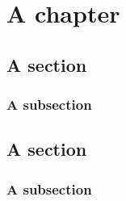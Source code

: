 \chapter{A chapter}

\lipsum


\section{A section}

\lipsum[4]

\subsection{A subsection}

\lipsum[4]

\section{A section}

\lipsum[4]

\subsection{A subsection}

\lipsum[4]
